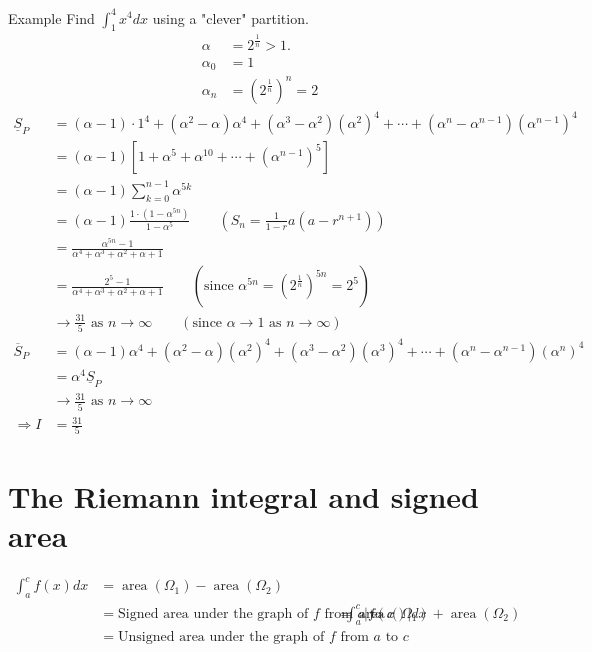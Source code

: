 \documentclass{report}
\DeclareMathOperator{\area}{area}
\begin{document}
		\begin{question}{Example}
			Find $\displaystyle\int_1^4 x^4 dx$ using a "clever" partition.
				\begin{align*}
					\alpha &= 2^{\frac{1}{n}} >1.	\\
					\alpha_0 &= 1			\\
					\alpha_n &= (2^{\frac{1}{n}})^n = 2
				\end{align*}
				\begin{align*}
					\underline{S}_P &= (\alpha-1) \cdot 1^4 + (\alpha^2 - \alpha)\alpha^4 + (\alpha^3 - \alpha^2)(\alpha^2)^4 + \cdots + (\alpha^n - \alpha^{n-1})(\alpha^{n-1})^4	\\
									&= (\alpha - 1) \left[1+\alpha^5 + \alpha^{10} + \cdots + (\alpha^{n-1})^5\right]	\\
									&= (\alpha - 1) \sum_{k=0}^{n-1} \alpha^{5k}	\\
									&= (\alpha - 1) \frac{1 \cdot (1-\alpha^{5n})}{1-\alpha^5}	\qquad (S_n = \frac{1}{1-r} a (a-r^{n+1}))\\
									&= \frac{\alpha^{5n} - 1}{\alpha^4 + \alpha^3 + \alpha^2 + \alpha + 1}	\\
									&= \frac{2^5 - 1}{\alpha^4 + \alpha^3 + \alpha^2 + \alpha + 1}	\qquad (\text{since } \alpha^{5n} = (2^{\frac{1}{n}})^{5n} = 2^5)	\\
									&\rightarrow \frac{31}{5} \text{ as } n \to \infty \qquad (\text{since } \alpha \to 1 \text{ as } n \to \infty)	\\
					 \overline{S}_P &= (\alpha-1)\alpha^4 + (\alpha^2-\alpha)(\alpha^2)^4 + (\alpha^3-\alpha^2)(\alpha^3)^4 + \cdots + (\alpha^n - \alpha^{n-1})(\alpha^n)^4	\\
								    &= \alpha^4 \underline{S}_P	\\
								    &\rightarrow \frac{31}{5} \text{ as } n \to \infty	\\
					  \Rightarrow I &= \frac{31}{5}
				\end{align*}
		\end{question}

	\section{The Riemann integral and signed area}

		\begin{align*}
			\int_a^c f(x) dx &= \area(\Omega_1) - \area(\Omega_2)	\\
							 &= \text{Signed area under the graph of $f$ from $a$ to $c$}
			\int_a^c |f(x)| dx &= \area(\Omega_1) + \area(\Omega_2)	\\
							 &= \text{Unsigned area under the graph of $f$ from $a$ to $c$}
		\end{align*}
\end{document}

